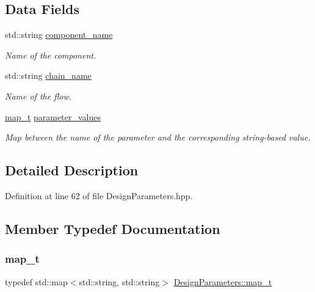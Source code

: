 \subsection*{Data Fields}
\begin{DoxyCompactItemize}
\item 
std\+::string \hyperlink{structDesignParameters_af42b3f5eebf08f494f102114d631a29a}{component\+\_\+name}
\begin{DoxyCompactList}\small\item\em Name of the component. \end{DoxyCompactList}\item 
std\+::string \hyperlink{structDesignParameters_af062927befa30ce5d47ef81cdb1ac607}{chain\+\_\+name}
\begin{DoxyCompactList}\small\item\em Name of the flow. \end{DoxyCompactList}\item 
\hyperlink{structDesignParameters_abe27b44a8a6b5a2dd04e2f4b637823a0}{map\+\_\+t} \hyperlink{structDesignParameters_a683faf438381e5a848a3411db1abed59}{parameter\+\_\+values}
\begin{DoxyCompactList}\small\item\em Map between the name of the parameter and the corresponding string-\/based value. \end{DoxyCompactList}\end{DoxyCompactItemize}


\subsection{Detailed Description}


Definition at line 62 of file Design\+Parameters.\+hpp.



\subsection{Member Typedef Documentation}
\mbox{\label{structDesignParameters_abe27b44a8a6b5a2dd04e2f4b637823a0}} 
\subsubsection{\texorpdfstring{map\+\_\+t}{map\_t}}
{\footnotesize\ttfamily typedef std\+::map$<$std\+::string, std\+::string$>$ \hyperlink{structDesignParameters_abe27b44a8a6b5a2dd04e2f4b637823a0}{Design\+Parameters\+::map\+\_\+t}}



